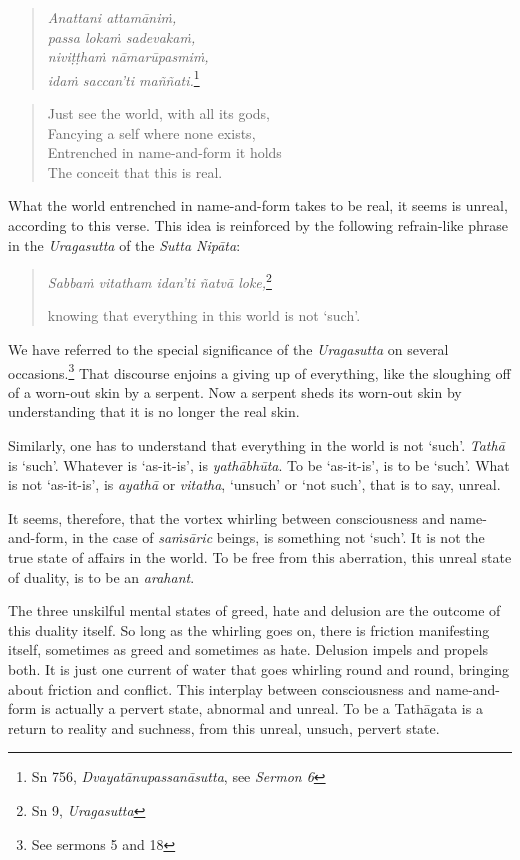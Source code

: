 \begin{quote}
\emph{Anattani attamāniṁ,}\\
\emph{passa lokaṁ sadevakaṁ,}\\
\emph{niviṭṭhaṁ nāmarūpasmiṁ,}\\
\emph{idaṁ saccan'ti maññati.}\footnote{Sn 756, \emph{Dvayatānupassanāsutta}, see \emph{Sermon 6}}
\end{quote}

\begin{quote}
Just see the world, with all its gods,\\
Fancying a self where none exists,\\
Entrenched in name-and-form it holds\\
The conceit that this is real.
\end{quote}

What the world entrenched in name-and-form takes to be real, it seems is unreal, according to this verse. This idea is reinforced by the following refrain-like phrase in the \emph{Uragasutta} of the \emph{Sutta Nipāta}:

\begin{quote}
\emph{Sabbaṁ vitatham idan'ti ñatvā loke,}\footnote{Sn 9, \emph{Uragasutta}}

knowing that everything in this world is not `such'.
\end{quote}

We have referred to the special significance of the \emph{Uragasutta} on several occasions.\footnote{See sermons 5 and 18} That discourse enjoins a giving up of everything, like the sloughing off of a worn-out skin by a serpent. Now a serpent sheds its worn-out skin by understanding that it is no longer the real skin.

Similarly, one has to understand that everything in the world is not `such'. \emph{Tathā} is `such'. Whatever is `as-it-is', is \emph{yathābhūta}. To be `as-it-is', is to be `such'. What is not `as-it-is', is \emph{ayathā} or \emph{vitatha}, `unsuch' or `not such', that is to say, unreal.

It seems, therefore, that the vortex whirling between consciousness and name-and-form, in the case of \emph{saṁsāric} beings, is something not `such'. It is not the true state of affairs in the world. To be free from this aberration, this unreal state of duality, is to be an \emph{arahant}.

The three unskilful mental states of greed, hate and delusion are the outcome of this duality itself. So long as the whirling goes on, there is friction manifesting itself, sometimes as greed and sometimes as hate. Delusion impels and propels both. It is just one current of water that goes whirling round and round, bringing about friction and conflict. This interplay between consciousness and name-and-form is actually a pervert state, abnormal and unreal. To be a Tathāgata is a return to reality and suchness, from this unreal, unsuch, pervert state.

